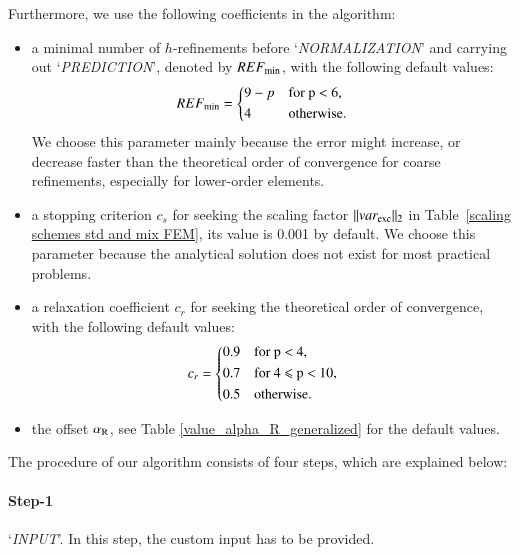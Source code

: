 \documentclass[review,3p]{elsarticle}
\begin{document}
Furthermore, we use the following coefficients in the algorithm:		%
\begin{itemize}
  \renewcommand\labelitemi{--}
  \item a minimal number of $h$-refinements before `\textit{NORMALIZATION}' and carrying out `\textit{PREDICTION}', denoted by $REF_{\rm min}$, with the following default values:
  \begin{equation}
  \begin{aligned}
      REF_{\rm min} &=
      \begin{cases*}
	9-p & for p $<$ 6, \\
	4 & otherwise.
      \end{cases*}
  \end{aligned}
  \end{equation} 
  We choose this parameter mainly because the error might increase, or decrease faster than the theoretical order of convergence for coarse refinements, especially for lower-order elements.
  \item a stopping criterion $c_s$ for seeking the scaling factor $\|var_{\rm exc}\|_{2}$ in Table~\ref{scaling schemes std and mix FEM}, its value is 0.001 by default. We choose this parameter because the analytical solution does not exist for most practical problems.
  \item a relaxation coefficient $c_r$ for seeking the theoretical order of convergence, with the following default values: 
    \begin{equation}
    \begin{aligned}
	c_r &=
	\begin{cases*}
	  0.9 & for p $<$ 4, \\
	  0.7 & for 4 $\leqslant$ p $<$ 10, \\
	  0.5 & otherwise.
	\end{cases*}
    \end{aligned}
    \end{equation}
  \item the offset $\alpha _{\rm R}$, see Table \ref{value_alpha_R_generalized} for the default values.
\end{itemize}

The procedure of our algorithm consists of four steps, which are explained below:

\paragraph{Step-1} `\textit{INPUT}'. In this step, the custom input has to be provided.
\end{document}

